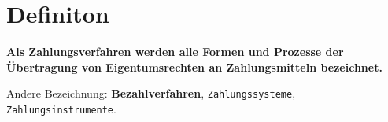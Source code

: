 \section{Definiton}
\textbf{Als Zahlungsverfahren werden alle Formen und Prozesse der Übertragung von Eigentumsrechten an Zahlungsmitteln bezeichnet.}

Andere Bezeichnung: \textbf{Bezahlverfahren}, \verb|Zahlungssysteme|, \verb|Zahlungsinstrumente|.